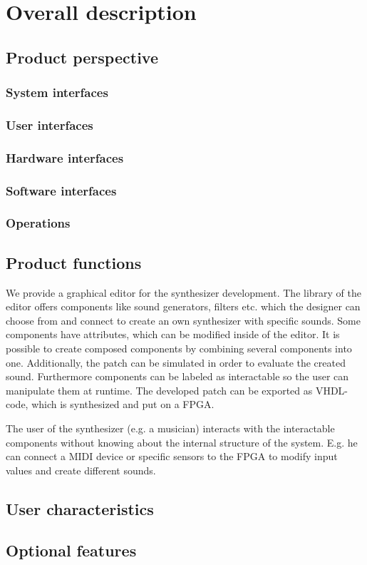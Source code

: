 \chapter{Overall description}
	\section{Product perspective}
		\subsection{System interfaces}
		\subsection{User interfaces}
		\subsection{Hardware interfaces}
		\subsection{Software interfaces}
		\subsection{Operations}
	\section{Product functions}
	We provide a graphical editor for the synthesizer development. The library of the editor offers components like sound generators, filters etc. which the designer can choose from and connect to create an own synthesizer with specific sounds. Some components have attributes, which can be modified inside of the editor. It is possible to create composed components by combining several components into one. Additionally, the patch can be simulated in order to evaluate the created sound. Furthermore components can be labeled as interactable so the user can manipulate them at runtime. The developed patch can be exported as VHDL-code, which is synthesized and put on a FPGA.

The user of the synthesizer (e.g. a musician) interacts with the interactable components without knowing about the internal structure of the system. E.g. he can connect a MIDI device or specific sensors to the FPGA to modify input values and create different sounds. 
	\section{User characteristics}
	\section{Optional features}
